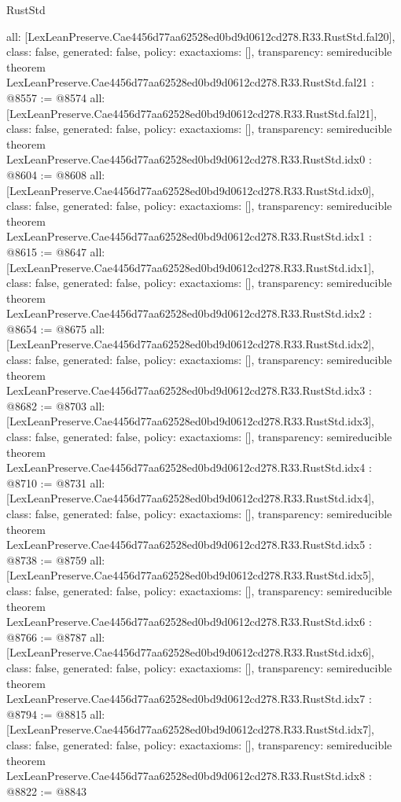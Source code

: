 \begin{lexlean}{RustStd}
\begin{coremodule}
{  all: [LexLeanPreserve.Cae4456d77aa62528ed0bd9d0612cd278.R33.RustStd.fal20],
  class: false,
  generated: false,
  policy: exact{axioms: []},
  transparency: semireducible
}
theorem LexLeanPreserve.Cae4456d77aa62528ed0bd9d0612cd278.R33.RustStd.fal21 : @8557 := @8574 {
  all: [LexLeanPreserve.Cae4456d77aa62528ed0bd9d0612cd278.R33.RustStd.fal21],
  class: false,
  generated: false,
  policy: exact{axioms: []},
  transparency: semireducible
}
theorem LexLeanPreserve.Cae4456d77aa62528ed0bd9d0612cd278.R33.RustStd.idx0 : @8604 := @8608 {
  all: [LexLeanPreserve.Cae4456d77aa62528ed0bd9d0612cd278.R33.RustStd.idx0],
  class: false,
  generated: false,
  policy: exact{axioms: []},
  transparency: semireducible
}
theorem LexLeanPreserve.Cae4456d77aa62528ed0bd9d0612cd278.R33.RustStd.idx1 : @8615 := @8647 {
  all: [LexLeanPreserve.Cae4456d77aa62528ed0bd9d0612cd278.R33.RustStd.idx1],
  class: false,
  generated: false,
  policy: exact{axioms: []},
  transparency: semireducible
}
theorem LexLeanPreserve.Cae4456d77aa62528ed0bd9d0612cd278.R33.RustStd.idx2 : @8654 := @8675 {
  all: [LexLeanPreserve.Cae4456d77aa62528ed0bd9d0612cd278.R33.RustStd.idx2],
  class: false,
  generated: false,
  policy: exact{axioms: []},
  transparency: semireducible
}
theorem LexLeanPreserve.Cae4456d77aa62528ed0bd9d0612cd278.R33.RustStd.idx3 : @8682 := @8703 {
  all: [LexLeanPreserve.Cae4456d77aa62528ed0bd9d0612cd278.R33.RustStd.idx3],
  class: false,
  generated: false,
  policy: exact{axioms: []},
  transparency: semireducible
}
theorem LexLeanPreserve.Cae4456d77aa62528ed0bd9d0612cd278.R33.RustStd.idx4 : @8710 := @8731 {
  all: [LexLeanPreserve.Cae4456d77aa62528ed0bd9d0612cd278.R33.RustStd.idx4],
  class: false,
  generated: false,
  policy: exact{axioms: []},
  transparency: semireducible
}
theorem LexLeanPreserve.Cae4456d77aa62528ed0bd9d0612cd278.R33.RustStd.idx5 : @8738 := @8759 {
  all: [LexLeanPreserve.Cae4456d77aa62528ed0bd9d0612cd278.R33.RustStd.idx5],
  class: false,
  generated: false,
  policy: exact{axioms: []},
  transparency: semireducible
}
theorem LexLeanPreserve.Cae4456d77aa62528ed0bd9d0612cd278.R33.RustStd.idx6 : @8766 := @8787 {
  all: [LexLeanPreserve.Cae4456d77aa62528ed0bd9d0612cd278.R33.RustStd.idx6],
  class: false,
  generated: false,
  policy: exact{axioms: []},
  transparency: semireducible
}
theorem LexLeanPreserve.Cae4456d77aa62528ed0bd9d0612cd278.R33.RustStd.idx7 : @8794 := @8815 {
  all: [LexLeanPreserve.Cae4456d77aa62528ed0bd9d0612cd278.R33.RustStd.idx7],
  class: false,
  generated: false,
  policy: exact{axioms: []},
  transparency: semireducible
}
theorem LexLeanPreserve.Cae4456d77aa62528ed0bd9d0612cd278.R33.RustStd.idx8 : @8822 := @8843 {
}
\end{coremodule}
\end{lexlean}
